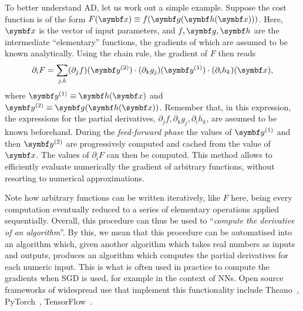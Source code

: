 To better understand \ac{AD}, let us work out a simple example.
Suppose the cost function is of the form
$F(\bs x)\equiv f(\bs g(\bs h(\bs x)))$.
Here, $\bs x$ is the vector of input parameters, and $f,\bs g,\bs h$ are the intermediate ``elementary'' functions, the gradients of which are assumed to be known analytically.
Using the chain rule, the gradient of $F$ then reads
\begin{equation}
    \partial_i F = \sum_{j,k}
        (\partial_j f)(\bs y^{(2)}) \cdot
        (\partial_k g_j)(\bs y^{(1)}) \cdot
        (\partial_i h_k)(\bs x),
\end{equation}
where $\bs y^{(1)}\equiv\bs h(\bs x)$ and $\bs y^{(2)}\equiv \bs g(\bs h(\bs x))$.
Remember that, in this expression, the expressions for the partial derivatives, $\partial_j f,\partial_k g_j, \partial_i h_k$, are assumed to be known beforehand.
During the \emph{feed-forward phase} the values of $\bs y^{(1)}$ and then $\bs y^{(2)}$ are progressively computed and cached from the value of $\bs x$.
The values of $\partial_i F$ can then be computed.
This method allows to efficiently evaluate numerically the gradient of arbitrary functions, without resorting to numerical approximations.

Note how arbitrary functions can be written iteratively, like $F$ here, being every computation eventually reduced to a series of elementary operations applied sequentially.
Overall, this procedure can thus be used to ``\emph{compute the derivative of an algorithm}''. By this, we mean that this procedure can be automatised into an algorithm which, given another algorithm which takes real numbers as inputs and outputs, produces an algorithm which computes the partial derivatives for each numeric input.
This is what is often used in practice to compute the gradients when SGD is used, for example in the context of NNs. Open source frameworks of widespread use that implement this functionality include Theano~\cite{team2016theano}, PyTorch~\cite{paszke2017automatic}, TensorFlow~\cite{tensorflow2015-whitepaper}.

